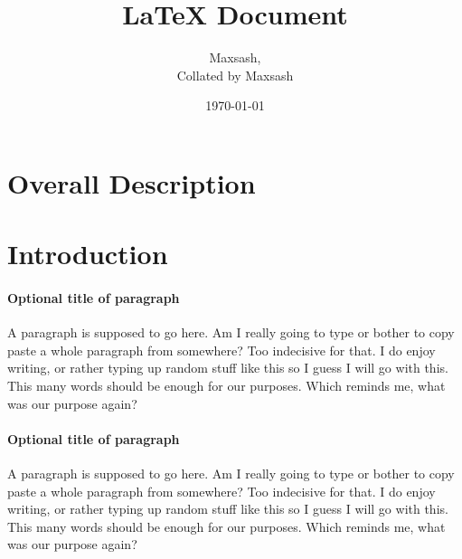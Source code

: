 \documentclass{article}
\title{LaTeX Document}
\author{Maxsash, \\Collated by Maxsash} %
\date{\today}
\begin{document}
	\maketitle

	\tableofcontents


	\pagestyle{empty}


	\section{Overall Description}
	
	\section{Introduction}


	\thispagestyle{headings}
	\setcounter{page}{503}
	\paragraph{Optional title of paragraph}
	A paragraph is supposed to go here. Am I really going to type or bother to copy paste a whole paragraph from somewhere? Too indecisive for that. I do enjoy writing, or rather typing up random stuff like this so I guess I will go with this. This many words should be enough for our purposes. Which reminds me, what was our purpose again?

	\paragraph{Optional title of paragraph}
	A paragraph is supposed to go here. Am I really going to type or bother to copy paste a whole paragraph from somewhere? Too indecisive for that. I do enjoy writing, or rather typing up random stuff like this so I guess I will go with this. This many words should be enough for our purposes. Which reminds me, what was our purpose again?
\end{document}
